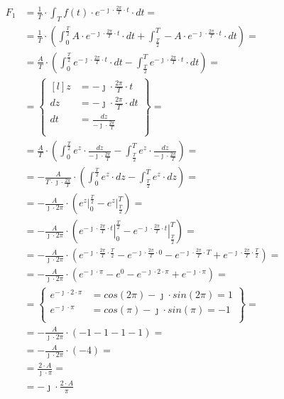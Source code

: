 \begin{task}

\begin{align*}
F_1&=\frac{1}{T} \cdot \int_{T}f(t) \cdot e^{-\jmath \cdot \frac{2\pi}{T} \cdot t} \cdot dt=\\
&=\frac{1}{T} \cdot \left(\int_{0}^{\frac{T}{2}}A \cdot e^{-\jmath \cdot \frac{2\pi}{T} \cdot t} \cdot dt + \int_{\frac{T}{2}}^{T}-A \cdot e^{-\jmath \cdot \frac{2\pi}{T} \cdot t} \cdot dt\right)=\\
&=\frac{A}{T} \cdot \left(\int_{0}^{\frac{T}{2}}e^{-\jmath \cdot \frac{2\pi}{T} \cdot t} \cdot dt - \int_{\frac{T}{2}}^{T}e^{-\jmath \cdot \frac{2\pi}{T} \cdot t} \cdot dt\right)=\\
&=\begin{Bmatrix*}[l]
z&=-\jmath \cdot \frac{2\pi}{T} \cdot t\\
dz&=-\jmath \cdot \frac{2\pi}{T} \cdot dt\\
dt&=\frac{dz}{-\jmath \cdot \frac{2\pi}{T}}\\
\end{Bmatrix*}=\\
&=\frac{A}{T} \cdot \left(\int_{0}^{\frac{T}{2}} e^{z} \cdot \frac{dz}{-\jmath \cdot \frac{2\pi}{T}}-\int_{\frac{T}{2}}^{T} e^{z} \cdot \frac{dz}{-\jmath \cdot \frac{2\pi}{T}}\right)=\\
&=-\frac{A}{T \cdot \jmath \cdot \frac{2\pi}{T}} \cdot \left(\int_{0}^{\frac{T}{2}} e^{z} \cdot dz - \int_{\frac{T}{2}}^{T} e^{z} \cdot dz\right)=\\
&=-\frac{A}{\jmath \cdot 2 \pi} \cdot \left(\left. e^{z} \right|_{0}^{\frac{T}{2}} - \left. e^{z} \right|_{\frac{T}{2}}^{T}\right)=\\
&=-\frac{A}{\jmath \cdot 2 \pi} \cdot \left(\left. e^{-\jmath \cdot \frac{2\pi}{T} \cdot t} \right|_{0}^{\frac{T}{2}} - \left. e^{-\jmath \cdot \frac{2\pi}{T} \cdot t} \right|_{\frac{T}{2}}^{T}\right)=\\
&=-\frac{A}{\jmath \cdot 2 \pi} \cdot \left( e^{-\jmath \cdot \frac{2\pi}{T} \cdot \frac{T}{2}} - e^{-\jmath \cdot \frac{2\pi}{T} \cdot 0} -e^{-\jmath \cdot \frac{2\pi}{T} \cdot T} + e^{-\jmath \cdot \frac{2\pi}{T} \cdot \frac{T}{2}}\right)=\\
&=-\frac{A}{\jmath \cdot 2 \pi} \cdot \left( e^{ -\jmath \cdot \pi } - e^{ 0} - e^{ -\jmath \cdot 2 \cdot \pi}+e^{ -\jmath \cdot \pi }\right)=\\
&=\begin{Bmatrix}
e^{ -\jmath \cdot 2\cdot \pi }&=cos(2\pi)-\jmath \cdot sin(2\pi)=1\\
e^{ -\jmath \cdot \pi }&=cos(\pi)-\jmath \cdot sin(\pi)=-1\\
\end{Bmatrix}=\\
&=-\frac{A}{\jmath \cdot 2 \pi} \cdot \left( -1 - 1 - 1 -1\right)=\\
&=-\frac{A}{\jmath \cdot 2 \pi} \cdot \left( -4\right)=\\
&=\frac{2 \cdot A}{\jmath \cdot \pi}=\\
&=-\jmath \cdot \frac{2 \cdot A}{\pi}
\end{align*}


\end{task}

